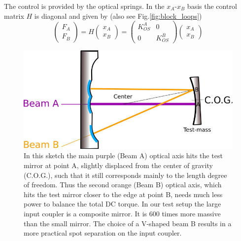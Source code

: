 The control is provided by the optical springs. In the $x_A$-$x_B$ basis the control matrix $H$ is diagonal and given by  (also see Fig.\ref{fig:block_loops})
\begin{equation}
\begin{pmatrix}
F_{A}\\ F_{B}
\end{pmatrix}
= H
 \begin{pmatrix}
x_A\\ x_B
\end{pmatrix} 
=  \begin{pmatrix}
K_{OS}^A & 0 \\ 0 & K_{OS}^B
\end{pmatrix} 
 \begin{pmatrix}
x_A\\ x_B
\end{pmatrix} 
\label{eq:HX}
\end{equation}

\begin{figure}[t]
	\centering
		\includegraphics[width=15cm]{./figures/trap_drawing_paper2.pdf}
	\caption[Angular Trap Schematic]{
	In this sketch the main purple (Beam A) optical axis hits the test mirror %
	at point A, slightly displaced from the center of gravity (C.O.G.), such
	 that it still corresponds mainly to the length degree of freedom. Thus the second orange (Beam B) optical axis, which hits the test mirror closer to the edge at point B, needs much less power to balance the total DC torque. In our test setup the large input coupler is a composite mirror. It is 600 times more massive than the small mirror. The choice of a V-shaped beam B results in a more practical spot separation on the input coupler. }	


	
	\label{fig:angular}
\end{figure}



